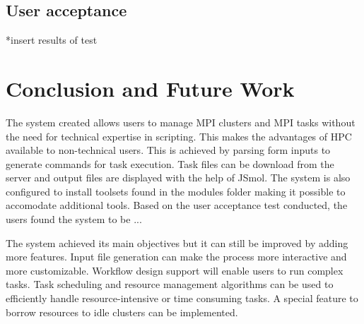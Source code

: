\documentclass[journal]{./IEEE/IEEEtran}
\begin{document}
	\subsection{User acceptance}
	*insert results of test
	
\section{Conclusion and Future Work}
The system created allows users to manage MPI clusters and MPI tasks without the need for technical expertise in scripting. This makes the advantages of HPC available to non-technical users. This is achieved by parsing form inputs to generate commands for task execution. Task files can be download from the server and output files are displayed with the help of JSmol\cite{IJCH:IJCH201300024}. The system is also configured to install toolsets found in the modules folder making it possible to accomodate additional tools. Based on the user acceptance test conducted, the users found the system to be ... 

The system achieved its main objectives but it can still be improved by adding more features. Input file generation can make the process more interactive and more customizable. Workflow design support will enable users to run complex tasks. Task scheduling and resource management algorithms can be used to efficiently handle resource-intensive or time consuming tasks. A special feature to borrow resources to idle clusters can be implemented. 







\end{document}
